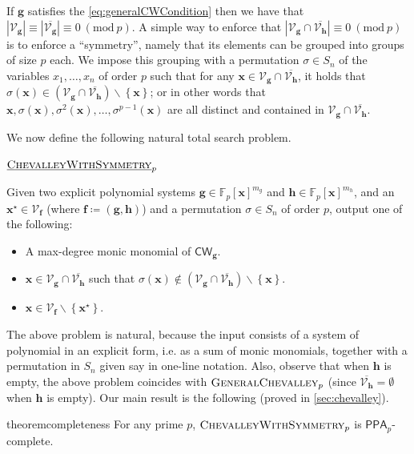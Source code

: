 \documentclass[10pt,a4paper]{article}
\theoremstyle{definition}
\theoremstyle{remark}
\newcommand{\inparen}[1]{\left ( #1 \right )}
\renewcommand{\mod}[1]{~\inparen{\mathrm{mod}~#1}}
\def\set#1{\left\{#1\right\}}
\newcommand{\bbF}{\ensuremath{\mathbb{F}}}
\newcommand{\calV}{\mathcal{V}}
\newcommand{\vecf}{\ensuremath{\boldsymbol{f}}}
\newcommand{\vecg}{\ensuremath{\boldsymbol{g}}}
\newcommand{\vech}{\ensuremath{\boldsymbol{h}}}
\newcommand{\vecx}{\ensuremath{\boldsymbol{x}}}
\newcommand{\class}[1]{\ensuremath{\mathsf{#1}}\xspace}
\newcommand{\PPA}{\class{PPA}}
\newcommand{\pnum}{p}
\newcommand{\cChevalleyp}{\textsc{ChevalleyWithSymmetry}_{\pnum}}
\newcommand{\lChevalley}{\textsc{GeneralChevalley}}
\newcommand{\cChevalley}{\textsc{ChevalleyWithSymmetry}}
\newcommand{\CW}{\mathsf{CW}}
\begin{document}
If $\vecg$ satisfies the \eqref{eq:generalCWCondition} then we have that $|\calV_{\vecg}| \equiv |\overline{\calV_{\vecg}}| \equiv 0 \mod{p}$. A simple way to enforce that $|\calV_{\vecg} \cap \overline{\calV_{\vech}}| \equiv 0 \mod{p}$ is to enforce a ``symmetry'', namely that its elements can be grouped into groups of size $p$ each. We impose this grouping with a permutation $\sigma \in S_n$ of the variables $x_1, \ldots, x_n$ of order $p$ such that for any $\vecx \in \calV_{\vecg} \cap \overline{\calV_{\vech}}$, it holds that $\sigma(\vecx) \in (\calV_{\vecg} \cap \overline{\calV_{\vech}}) \smallsetminus \set{\vecx}$; or in other words that $\vecx, \sigma(\vecx), \sigma^2(\vecx), \ldots, \sigma^{p-1}(\vecx)$ are all distinct and contained in $\calV_{\vecg} \cap \overline{\calV_{\vech}}$.

We now define the
following natural total search problem.

\bigskip

\noindent $\underbar{\cChevalley}_{\pnum}$

\noindent Given two explicit polynomial systems $\vecg \in \bbF_p[\vecx]^{m_g}$ and $\vech \in \bbF_p[\vecx]^{m_h}$, and an $\vecx^{\star} \in \calV_{\vecf}$ (where $\vecf \coloneqq (\vecg, \vech)$) and a
permutation $\sigma \in S_n$ of order $p$, output one of the following:\vspace{-0.5mm}
\begin{itemize}
	\item[$\triangleright$] [{\em Refuting Witness} -- 1] A max-degree monic monomial of $\CW_{\vecg}$.
  \item[$\triangleright$] [{\em Refuting Witness} -- 2] $\vecx \in \calV_{\vecg} \cap \overline{\calV_{\vech}}$ such that $\sigma(\vecx) \notin (\calV_{\vecg} \cap \overline{\calV_{\vech}}) \smallsetminus \set{\vecx}$.
	\item[$\triangleright$] $\vecx \in \calV_{\vecf} \smallsetminus \set{\vecx^{\star}}$.
\end{itemize}
\medskip

\noindent The above problem is natural, because the input consists of a system of polynomial in an
explicit form, i.e. as a sum of monic monomials, together with a permutation in $S_n$ given say in
one-line notation. Also, observe that when $\vech$ is empty, the above problem coincides with $\lChevalley_p$ (since $\overline{\calV_{\vech}} = \emptyset$ when $\vech$ is empty). Our main result is the following (proved in \autoref{sec:chevalley}).

\setcounter{theorem}{2}
\begin{restatable}{theorem}{completeness}
\label{thm:combinedChevalleyPPApCompleteness}
For any prime $p$, $\cChevalleyp$ is
$\PPA_p$-complete.
\end{restatable}
\end{document}
